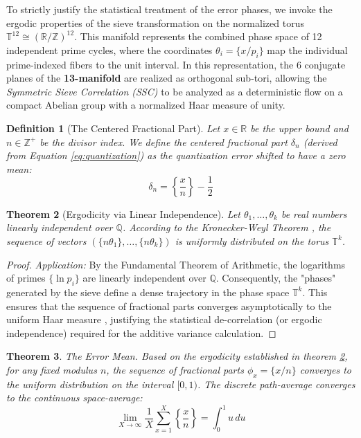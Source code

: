 \documentclass[sn-mathphys-num, pdflatex, referee]{sn-jnl}
\newtheorem{theorem}{Theorem}[section]
\newtheorem{definition}[theorem]{Definition}
\begin{document}
To strictly justify the statistical treatment of the error phases, we invoke the ergodic properties of the sieve transformation on the normalized torus $\mathbb{T}^{12} \cong (\mathbb{R}/\mathbb{Z})^{12}$. This manifold represents the combined phase space of 12 independent prime cycles, where the coordinates $\theta_i = \{x/p_i\}$ map the individual prime-indexed fibers to the unit interval. In this representation, the 6 conjugate planes of the \textbf{13-manifold} are realized as orthogonal sub-tori, allowing the \textit{Symmetric Sieve Correlation (SSC)} to be analyzed as a deterministic flow on a compact Abelian group with a normalized Haar measure of unity.

\begin{definition}[The Centered Fractional Part]
Let $x \in \mathbb{R}$ be the upper bound and $n \in \mathbb{Z}^{+}$ be the divisor index. We define the centered fractional part $\delta_{n}$ (derived from Equation \ref{eq:quantization}) as the quantization error shifted to have a zero mean:
\begin{equation}
\delta_{n} = \left\{\frac{x}{n}\right\} - \frac{1}{2}
\end{equation}
\end{definition}

\begin{theorem}[Ergodicity via Linear Independence]
\label{theorem:equidistribution}
Let $\theta_{1}, \dots, \theta_{k}$ be real numbers linearly independent over $\mathbb{Q}$. According to the Kronecker-Weyl Theorem \cite{weyl}, the sequence of vectors $(\{n\theta_{1}\}, \dots, \{n\theta_{k}\})$ is uniformly distributed on the torus $\mathbb{T}^{k}$.
\end{theorem}

\begin{proof}
\textit{Application:} By the Fundamental Theorem of Arithmetic, the logarithms of primes $\{\ln p_i\}$ are linearly independent over $\mathbb{Q}$. Consequently, the "phases" generated by the sieve define a dense trajectory in the phase space $\mathbb{T}^k$. This ensures that the sequence of fractional parts converges asymptotically to the uniform Haar measure \cite{halmos1950measure}, justifying the statistical de-correlation (or ergodic independence) required for the additive variance calculation.
\end{proof}

\begin{theorem}
\label{theorem:mean}
\textit{The Error Mean.}
Based on the ergodicity established in theorem \ref{theorem:equidistribution}, for any fixed modulus $n$, the sequence of fractional parts $\phi_x = \{x/n\}$ converges to the uniform distribution on the interval $[0, 1)$. The discrete path-average converges to the continuous space-average:
\begin{equation}
\lim_{X \to \infty} \frac{1}{X} \sum_{x=1}^{X} \left\{\frac{x}{n}\right\} = \int_0^1 u \, du
\end{equation}
\end{theorem}
\end{document}
